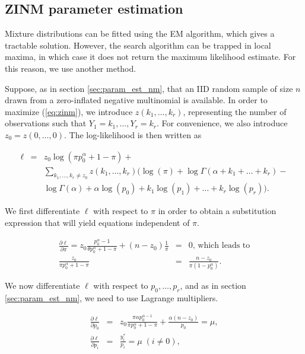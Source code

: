 \documentclass[12pt]{article}
\begin{document}
\subsection{ZINM parameter estimation}
\label{sec:zinm_parameter_est}

    Mixture distributions can be fitted using the EM algorithm,
    which gives a tractable solution. However,
    the search algorithm can be trapped in local maxima, in which
    case it does not return the maximum likelihood estimate. For
    this reason, we use another method.

    Suppose, as in section \ref{sec:param_est_nm}, that an IID random
    sample of size $n$ drawn from a zero-inflated negative multinomial
    is available. In order to maximize (\ref{eq:zinm}), we introduce
    $z(k_1, \ldots, k_r)$, representing the number of observations
    such that $Y_1 = k_1, \ldots, Y_r = k_r$. For convenience, we
    also introduce $z_0 = z(0, \ldots, 0)$. The log-likelihood
    is then written as

    \begin{eqnarray*}
      \ell &=& z_0 \log(\pi p_0^{\alpha}+1-\pi) + \\
      &\;&\sum_{k_1, \ldots, k_r \neq z_0}z(k_1, \ldots,k_r)
      \Big( \log(\pi) + \log \Gamma(\alpha+k_1+\ldots+k_r) - \\
      &\;&\log \Gamma(\alpha) +  \alpha \log(p_0) +
      k_1\log(p_1) + \ldots + k_r\log(p_r) \Big).
    \end{eqnarray*}

    We first differentiate $\ell$ with respect to $\pi$ in order
    to obtain a substitution expression that will yield equations
    independent of $\pi$.

    \begin{eqnarray}
      \frac{\partial\ell}{\partial\pi} =
      z_0 \frac{p_0^{\alpha}-1}{\theta p_0^{\alpha}+1-\pi}
      + (n-z_0)\frac{1}{\pi} &=& 0
      \mbox{, which leads to} \nonumber \\
\label{eq:sub_pi}
\frac{z_0}{\pi p_0^{\alpha}+1-\pi} &=&
      \frac{n-z_0}{\pi(1-p_0^{\alpha})}.
    \end{eqnarray}

    We now differentiate $\ell$ with respect to $p_0, \ldots, p_r$,
    and as in section \ref{sec:param_est_nm}, we need to use Lagrange
    multipliers.

    \begin{eqnarray}
      \frac{\partial\ell}{\partial p_0} &=&
      z_0 \frac{\pi \alpha p_0^{\alpha-1}}
      {\pi p_0^{\alpha}+1-\pi} +
      \frac{\alpha(n-z_0)}{p_0} = \mu, \nonumber \\
      \frac{\partial\ell}{\partial p_i} &=&
      \frac{y_i^*}{p_i} = \mu \; (i \neq 0),
    \end{eqnarray}
\end{document}
